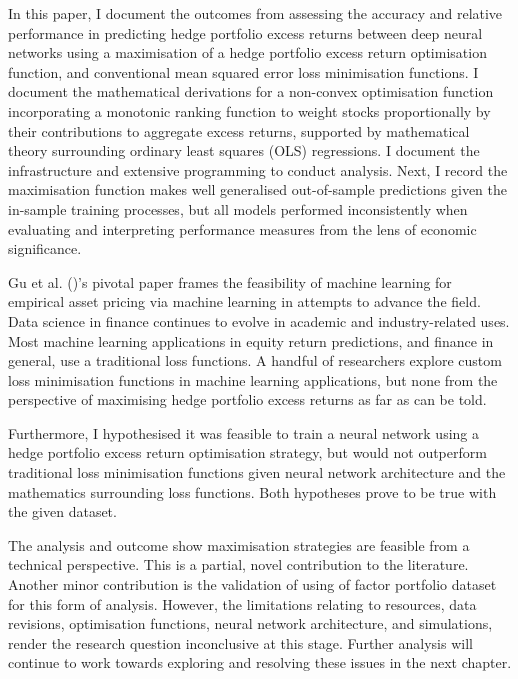 In this paper, I document the outcomes from assessing the accuracy and relative performance
in predicting hedge portfolio excess returns between deep neural networks using a 
maximisation of a hedge portfolio excess return optimisation function, and conventional mean squared error loss minimisation functions.
I document the mathematical derivations for a non-convex optimisation function incorporating a monotonic ranking function
to weight stocks proportionally by their contributions to aggregate excess returns, supported by mathematical theory surrounding ordinary least squares (OLS) regressions.
I document the infrastructure and extensive programming to conduct analysis.
Next, I record the maximisation function makes well generalised out-of-sample predictions given the in-sample training processes,
but all models performed inconsistently when evaluating and interpreting performance measures from the lens of economic significance.

Gu et al. (\citeyear{eapvml})'s pivotal paper frames the feasibility of machine learning for empirical asset pricing via machine learning in attempts to advance the field.
Data science in finance continues to evolve in academic and industry-related uses.
Most machine learning applications in equity return predictions, and finance in general, use a traditional loss functions.
A handful of researchers explore custom loss minimisation functions in machine learning applications, but none from the perspective of maximising hedge portfolio excess returns as far as can be told.

Furthermore, I hypothesised it was feasible to train a neural network using a hedge portfolio excess return optimisation strategy, 
but would not outperform traditional loss minimisation functions given neural network architecture and the mathematics surrounding loss functions.
Both hypotheses prove to be true with the given dataset.

The analysis and outcome show maximisation strategies are feasible from a technical perspective. This is a partial, novel contribution to the literature.
Another minor contribution is the validation of using of factor portfolio dataset for this form of analysis.
However, the limitations relating to resources, data revisions, optimisation functions, neural network architecture, and simulations, render the research
question inconclusive at this stage. Further analysis will continue to work towards exploring and resolving these issues in the next chapter.